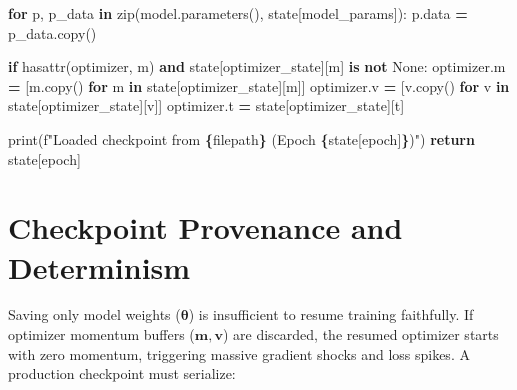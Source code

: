 \documentclass[
  letterpaper,
]{scrbook}
\newenvironment{Shaded}{\begin{snugshade}}{\end{snugshade}}
\newcommand{\BuiltInTok}[1]{#1}
\newcommand{\ControlFlowTok}[1]{\textcolor[rgb]{0.13,0.29,0.53}{\textbf{#1}}}
\newcommand{\KeywordTok}[1]{\textcolor[rgb]{0.13,0.29,0.53}{\textbf{#1}}}
\newcommand{\NormalTok}[1]{#1}
\newcommand{\OperatorTok}[1]{\textcolor[rgb]{0.81,0.36,0.00}{\textbf{#1}}}
\newcommand{\SpecialCharTok}[1]{\textcolor[rgb]{0.81,0.36,0.00}{\textbf{#1}}}
\newcommand{\SpecialStringTok}[1]{\textcolor[rgb]{0.31,0.60,0.02}{#1}}
\newcommand{\StringTok}[1]{\textcolor[rgb]{0.31,0.60,0.02}{#1}}
\newcommand{\VariableTok}[1]{\textcolor[rgb]{0.00,0.00,0.00}{#1}}
\begin{document}
\begin{Shaded}
\begin{Highlighting}[]
    \ControlFlowTok{for}\NormalTok{ p, p\_data }\KeywordTok{in} \BuiltInTok{zip}\NormalTok{(model.parameters(), state[}\StringTok{\textquotesingle{}model\_params\textquotesingle{}}\NormalTok{]):}
\NormalTok{        p.data }\OperatorTok{=}\NormalTok{ p\_data.copy()}

    \ControlFlowTok{if} \BuiltInTok{hasattr}\NormalTok{(optimizer, }\StringTok{\textquotesingle{}m\textquotesingle{}}\NormalTok{) }\KeywordTok{and}\NormalTok{ state[}\StringTok{\textquotesingle{}optimizer\_state\textquotesingle{}}\NormalTok{][}\StringTok{\textquotesingle{}m\textquotesingle{}}\NormalTok{] }\KeywordTok{is} \KeywordTok{not} \VariableTok{None}\NormalTok{:}
\NormalTok{        optimizer.m }\OperatorTok{=}\NormalTok{ [m.copy() }\ControlFlowTok{for}\NormalTok{ m }\KeywordTok{in}\NormalTok{ state[}\StringTok{\textquotesingle{}optimizer\_state\textquotesingle{}}\NormalTok{][}\StringTok{\textquotesingle{}m\textquotesingle{}}\NormalTok{]]}
\NormalTok{        optimizer.v }\OperatorTok{=}\NormalTok{ [v.copy() }\ControlFlowTok{for}\NormalTok{ v }\KeywordTok{in}\NormalTok{ state[}\StringTok{\textquotesingle{}optimizer\_state\textquotesingle{}}\NormalTok{][}\StringTok{\textquotesingle{}v\textquotesingle{}}\NormalTok{]]}
\NormalTok{        optimizer.t }\OperatorTok{=}\NormalTok{ state[}\StringTok{\textquotesingle{}optimizer\_state\textquotesingle{}}\NormalTok{][}\StringTok{\textquotesingle{}t\textquotesingle{}}\NormalTok{]}

    \BuiltInTok{print}\NormalTok{(}\SpecialStringTok{f"Loaded checkpoint from }\SpecialCharTok{\{}\NormalTok{filepath}\SpecialCharTok{\}}\SpecialStringTok{ (Epoch }\SpecialCharTok{\{}\NormalTok{state[}\StringTok{\textquotesingle{}epoch\textquotesingle{}}\NormalTok{]}\SpecialCharTok{\}}\SpecialStringTok{)"}\NormalTok{)}
    \ControlFlowTok{return}\NormalTok{ state[}\StringTok{\textquotesingle{}epoch\textquotesingle{}}\NormalTok{]}
\end{Highlighting}
\end{Shaded}

\section{Checkpoint Provenance and
Determinism}\label{checkpoint-provenance-and-determinism}

Saving only model weights (\(\mathbf{\theta}\)) is insufficient to
resume training faithfully. If optimizer momentum buffers
(\(\mathbf{m}, \mathbf{v}\)) are discarded, the resumed optimizer starts
with zero momentum, triggering massive gradient shocks and loss spikes.
A production checkpoint must serialize:
\end{document}
